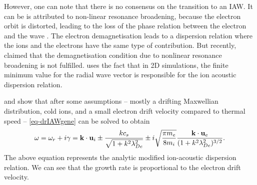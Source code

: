     
    However, one can note that there is no consensus on the transition to an \ac{IAW}.
    It can be is attributed to non-linear resonance broadening, because the electron orbit is distorted, leading to the loss of the phase relation between the electron and the wave \citep{taccogna2019}.
    The electron demagnetisation leads to a dispersion relation where the ions and the electrons have the same type of contribution.
    But recently, \citet{janhunen2018a} claimed that the demagnetisation condition due to nonlinear resonance broadening is not fulfilled.
    \citet{lafleur2017a} uses the fact that in \ac{2D} simulations, the finite minimum value for the radial wave vector is responsible for the ion acoustic dispersion relation.
    
    \citet{lafleur2016} and \citet{janhunen2018} show that after some assumptions -- mostly a drifting Maxwellian distribution, cold ions, and a small electron drift velocity compared to thermal speed -- \cref{eq-drIAWgene} can be solved to obtain
    \begin{equation} \label{eq-MIAW}
      \omega = \omega_r + i \gamma = {\mathbf k} \cdot {\mathbf u_{i}} \pm \frac{k c_s}{\sqrt{1 + k^2 \lambda_{De}^2}} \pm i \sqrt{\frac{\pi m_e}{8 m_i}} \frac{{\mathbf k} \cdot {\mathbf u_{e}}}{( 1 + k^2 \lambda_{De}^2)^{3/2}}.
    \end{equation}
    The above equation represents the analytic modified ion-acoustic dispersion relation.
    We can see that the growth rate is proportional to the electron drift velocity.
    
